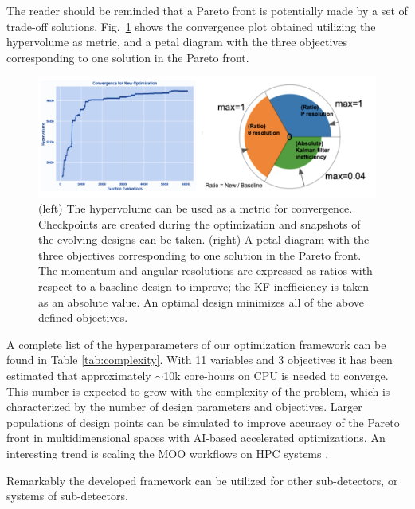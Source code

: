 The reader should be reminded that a Pareto front is potentially made by a set of trade-off solutions. Fig.~\ref{fig:convergence} shows the convergence plot obtained utilizing the hypervolume as metric, and a petal diagram with the three objectives corresponding to one solution in the Pareto front. 

\begin{figure}[!]
    \centering
    \includegraphics[scale = 0.35]{figs/convergence.png}
    \caption{(left) The hypervolume can be used as a metric for convergence. Checkpoints are created during the optimization and snapshots of the evolving designs can be taken. (right) A petal diagram with the three objectives corresponding to one solution in the Pareto front. The momentum and angular resolutions are expressed as ratios with respect to a baseline design to improve; the KF inefficiency is taken as an absolute value. An optimal design minimizes all of the above defined objectives. 
}
    \label{fig:convergence}
\end{figure}

A complete list of the hyperparameters of our optimization framework can be found in Table \ref{tab:complexity}.
With 11 variables and 3 objectives it has been estimated that approximately $\sim$10k core-hours on CPU is needed to converge. 
%
This number is expected to grow with the complexity of the problem,  which is characterized by the number of design parameters and objectives. 
%
%
Larger populations of design points can be simulated to improve accuracy of the Pareto front in multidimensional spaces with AI-based accelerated optimizations. 
An interesting trend is scaling the MOO workflows on HPC systems \cite{liu2020parallelization}. 

Remarkably the developed framework can be utilized for other sub-detectors, or systems of sub-detectors.


